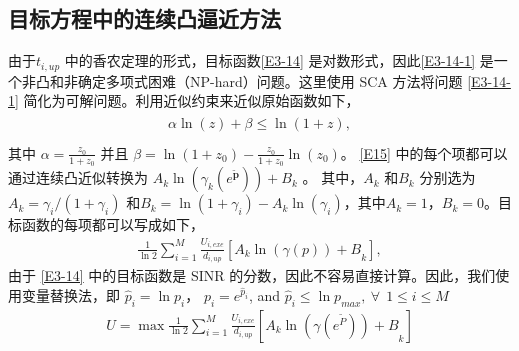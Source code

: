 \subsection{目标方程中的连续凸逼近方法}\label{section3-3-1}
由于$t_{i,up}$ 中的香农定理的形式，目标函数\eqref{E3-14} 是对数形式，因此\eqref{E3-14-1} 是一个非凸和非确定多项式困难（NP-hard）问题。这里使用 SCA 方法将问题 \eqref{E3-14-1} 简化为可解问题。利用近似约束来近似原始函数如下，
\begin{eqnarray}\label{E15}
\begin{array}{ll}
\alpha \ln{\left(z\right)}+\beta\le \ln{\left(1+z\right)},\\
\end{array}
\end{eqnarray}
其中 $\alpha=\frac{z_0}{1+z_0}$ 并且 $\beta=\ln{\left(1+z_0\right)}-\frac{z_0}{1+z_0}\ln{\left(z_0\right)}$。 \eqref{E15} 中的每个项都可以通过连续凸近似转换为 $A_k\ln\left(\gamma_k\left(e^{\widetilde{\mathbf{p}}}\right)\right)+B_k$ 。 其中，$A_k$ 和$B_k$ 分别选为$A_k=\gamma_i/\left(1+\gamma_i\right)$ 和$B_k=\ln{\left(1+\gamma_i\right)}-A_k\ln{\left(\gamma_i\right)}$，其中$A_k=1$，$B_k=0$。目标函数的每项都可以写成如下，
\begin{eqnarray}\label{E16}
\frac{1}{\ln{2}}\sum_{i=1}^{M}{\frac{U_{i,exe}}{d_{i,up}}\left.\left[{A_k\ln{\left(\gamma\left(p\right)\right)}+B}_k\right.\right]},
\end{eqnarray}
由于 \eqref{E3-14} 中的目标函数是 SINR 的分数，因此不容易直接计算。因此，我们使用变量替换法，即 ${\hat{p}}_i=\ln{p_i}$，
$p_i=e^{{\hat{p}}_i}$, and ${\hat{p}}_i\le \ln{p_{max}},\ \forall\ \ 1\le i\le M$
\begin{eqnarray}\label{E17}
U=\max\frac{1}{\ln{2}}\sum_{i=1}^{M}\left.\frac{U_{i,exe}}{d_{i,up}}\left[{A_k\ln{\left(\gamma\left(e^{\widetilde{P}}\right)\right)}+B}_k\right.\right]
\end{eqnarray}


